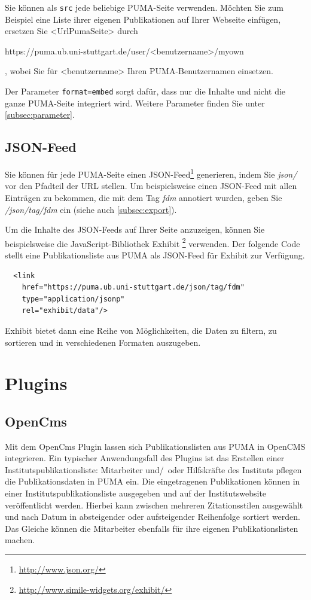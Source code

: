 Sie können als \texttt{src} jede beliebige PUMA-Seite verwenden. Möchten Sie zum Beispiel eine Liste ihrer eigenen Publikationen  auf Ihrer Webseite einfügen, ersetzen Sie <UrlPumaSeite> durch \begin{small}https://puma.ub.uni-stuttgart.de/user/<benutzername>/myown\end{small}, wobei Sie für <benutzername> Ihren PUMA-Benutzernamen einsetzen.

Der Parameter \texttt{format=embed} sorgt dafür, dass nur die Inhalte und nicht die ganze PUMA-Seite integriert wird. Weitere Parameter finden Sie unter \autoref{subsec:parameter}.

\subsection{JSON-Feed}
\label{subsec:jsonFeed}
Sie können für jede PUMA-Seite einen JSON-Feed\footnote{\url{http://www.json.org/}} generieren, indem Sie \textit{json/} vor den Pfadteil der URL stellen. Um beispielsweise einen JSON-Feed mit allen Einträgen zu bekommen, die mit dem Tag \textit{fdm} annotiert wurden, geben Sie \textit{/json/tag/fdm} ein (siehe auch \autoref{subsec:export}). 

Um die Inhalte des  JSON-Feeds auf Ihrer Seite anzuzeigen, können Sie beispielsweise die JavaScript-Bibliothek Exhibit \footnote{\url{http://www.simile-widgets.org/exhibit/}} verwenden. Der folgende Code stellt eine Publikationsliste aus PUMA als JSON-Feed für Exhibit zur Verfügung.

\lstset{language=HTML}
\begin{lstlisting}
  <link
    href="https://puma.ub.uni-stuttgart.de/json/tag/fdm"
    type="application/jsonp"
    rel="exhibit/data"/> 
\end{lstlisting}

Exhibit bietet dann eine Reihe von Möglichkeiten, die Daten zu filtern, zu sortieren und in verschiedenen Formaten auszugeben.

\section{Plugins} 
\label{sec:plugins}
\subsection{OpenCms}
\label{subsec:opencms}
Mit dem OpenCms Plugin lassen sich Publikationslisten aus PUMA in OpenCMS integrieren. Ein typischer Anwendungsfall des Plugins ist das Erstellen einer Instituts\-publi\-kations\-liste: Mitarbeiter und/~oder Hilfskräfte des Instituts pflegen die Publikationsdaten in PUMA ein. Die eingetragenen Publikationen können in einer Instituts\-publi\-kations\-liste ausgegeben und auf der Instituts\-website veröffentlicht werden. Hierbei kann zwischen mehreren Zitationsstilen ausgewählt und nach Datum in absteigender oder aufsteigender Reihenfolge sortiert werden. Das Gleiche können die Mitarbeiter ebenfalls für ihre eigenen Publikationslisten machen.
